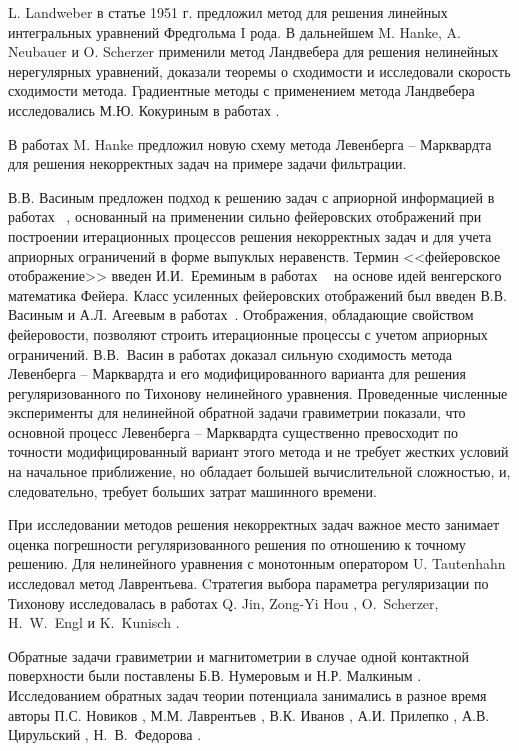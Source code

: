 {L. Landweber в статье \cite{Lan1951} 1951 г. предложил метод для решения линейных интегральных уравнений Фредгольма I рода. В дальнейшем M. Hanke, A. Neubauer и O. Scherzer \cite{HanNeuSch1995,Neu2000,NeuSch1995_2} применили метод Ландвебера для решения нелинейных нерегулярных уравнений, доказали теоремы о сходимости и исследовали скорость сходимости метода. Градиентные методы с применением метода Ландвебера исследовались М.Ю. Кокуриным в работах \cite{Kok2010_1,Kok2010_2}.

В работах \cite{Han1997,Han2010} M. Hanke предложил новую схему метода Левенберга -- Марквардта для решения некорректных задач на примере задачи фильтрации.

В.В. Васиным предложен подход к решению задач с априорной информацией в работах ~\cite{Vas1982, Vas1988,VasAge1993, VasEre2009}, основанный на применении сильно фейеровских отображений при построении итерационных процессов решения некорректных задач и для учета априорных ограничений в форме выпуклых неравенств. Термин <<фейеровское отображение>> введен И.И.~Ереминым в работах ~\cite{Ere1965, Ere1966, Ere1968} на основе идей венгерского математика Фейера. Класс усиленных фейеровских отображений был введен В.В. Васиным и А.Л. Агеевым в работах~\cite{VasAge1993,VasEre2009}. Отображения, обладающие свойством фейеровости, позволяют строить итерационные процессы с учетом априорных ограничений. В.В.~Васин в работах \cite{VasPer_2011,Vasin_2012} доказал сильную сходимость метода Левенберга -- Марквардта и его модифицированного варианта для решения регуляризованного по Тихонову нелинейного уравнения. Проведенные численные эксперименты для нелинейной обратной задачи гравиметрии показали, что основной процесс Левенберга -- Марквардта существенно превосходит по точности модифицированный вариант этого метода и не требует жестких условий на начальное приближение, но обладает большей вычислительной сложностью, и, следовательно, требует больших затрат машинного времени.

При исследовании методов решения некорректных задач важное место занимает оценка погрешности регуляризованного решения по отношению к точному решению. Для нелинейного уравнения с монотонным оператором U. Tautenhahn \cite{Tau2002,Tau2004} исследовал метод Лаврентьева. Cтратегия выбора параметра регуляризации по Тихонову исследовалась в работах Q. Jin, Zong-Yi Hou \cite{JinZon1997,JinZon1999}, O.~Scherzer, H.~W.~Engl и K.~Kunisch \cite{SchEngKun1993}.

Обратные задачи гравиметрии и магнитометрии в случае одной контактной поверхности были поставлены Б.В. Нумеровым и Н.Р. Малкиным \cite{Num1930, Mal1931}. Исследованием обратных задач теории потенциала занимались в разное время авторы П.С. Новиков \cite{Nov1938}, М.М. Лаврентьев \cite{Lavr1956}, В.К. Иванов \cite{Iv1962_1}, А.И. Прилепко \cite{Pri1965}, А.В. Цирульский \cite{Tsi1990}, Н.~В.~Федорова \cite{FedTsi1976}.

}
